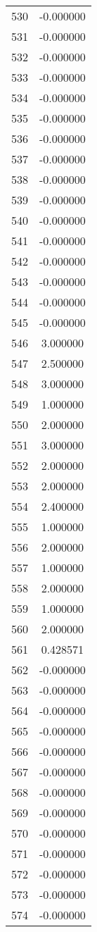 \documentclass[12pt]{article}
\begin{document}
\begin{longtable}{@{}cc@{}}
530 & -0.000000 \\
531 & -0.000000 \\
532 & -0.000000 \\
533 & -0.000000 \\
534 & -0.000000 \\
535 & -0.000000 \\
536 & -0.000000 \\
537 & -0.000000 \\
538 & -0.000000 \\
539 & -0.000000 \\
540 & -0.000000 \\
541 & -0.000000 \\
542 & -0.000000 \\
543 & -0.000000 \\
544 & -0.000000 \\
545 & -0.000000 \\
546 & 3.000000 \\
547 & 2.500000 \\
548 & 3.000000 \\
549 & 1.000000 \\
550 & 2.000000 \\
551 & 3.000000 \\
552 & 2.000000 \\
553 & 2.000000 \\
554 & 2.400000 \\
555 & 1.000000 \\
556 & 2.000000 \\
557 & 1.000000 \\
558 & 2.000000 \\
559 & 1.000000 \\
560 & 2.000000 \\
561 & 0.428571 \\
562 & -0.000000 \\
563 & -0.000000 \\
564 & -0.000000 \\
565 & -0.000000 \\
566 & -0.000000 \\
567 & -0.000000 \\
568 & -0.000000 \\
569 & -0.000000 \\
570 & -0.000000 \\
571 & -0.000000 \\
572 & -0.000000 \\
573 & -0.000000 \\
574 & -0.000000 \\

\end{longtable}
\end{document}
